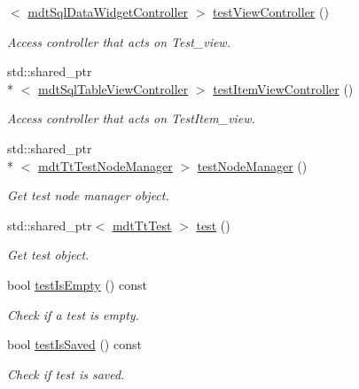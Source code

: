 \begin{DoxyCompactItemize}
$<$ \hyperlink{classmdt_sql_data_widget_controller}{mdt\-Sql\-Data\-Widget\-Controller} $>$ \hyperlink{classmdt_tt_abstract_tester_af85c7e2df1cc879b979024706848304c}{test\-View\-Controller} ()
\begin{DoxyCompactList}\small\item\em Access controller that acts on Test\-\_\-view. \end{DoxyCompactList}\item 
std\-::shared\-\_\-ptr\\*
$<$ \hyperlink{classmdt_sql_table_view_controller}{mdt\-Sql\-Table\-View\-Controller} $>$ \hyperlink{classmdt_tt_abstract_tester_a06b95c567684157712ae4a6155404297}{test\-Item\-View\-Controller} ()
\begin{DoxyCompactList}\small\item\em Access controller that acts on Test\-Item\-\_\-view. \end{DoxyCompactList}\item 
std\-::shared\-\_\-ptr\\*
$<$ \hyperlink{classmdt_tt_test_node_manager}{mdt\-Tt\-Test\-Node\-Manager} $>$ \hyperlink{classmdt_tt_abstract_tester_a7b8351e2214a3bfc57d38bfeab3e0342}{test\-Node\-Manager} ()
\begin{DoxyCompactList}\small\item\em Get test node manager object. \end{DoxyCompactList}\item 
std\-::shared\-\_\-ptr$<$ \hyperlink{classmdt_tt_test}{mdt\-Tt\-Test} $>$ \hyperlink{classmdt_tt_abstract_tester_a096db7bd6418195ba2a372ba1bec923f}{test} ()
\begin{DoxyCompactList}\small\item\em Get test object. \end{DoxyCompactList}\item 
bool \hyperlink{classmdt_tt_abstract_tester_ac9eead60ccacb39581dd792d00a18466}{test\-Is\-Empty} () const 
\begin{DoxyCompactList}\small\item\em Check if a test is empty. \end{DoxyCompactList}\item 
bool \hyperlink{classmdt_tt_abstract_tester_af98bb9d80bfbd14873fc356c17d31eb4}{test\-Is\-Saved} () const 
\begin{DoxyCompactList}\small\item\em Check if test is saved. \end{DoxyCompactList}\end{DoxyCompactItemize}
